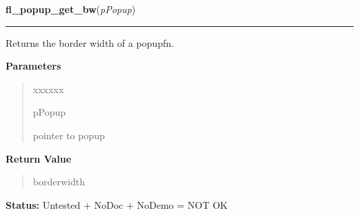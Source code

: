 \hspace{.8\funcindent}\begin{boxedminipage}{\funcwidth}

    \raggedright \textbf{fl\_popup\_get\_bw}(\textit{pPopup})

    \vspace{-1.5ex}

    \rule{\textwidth}{0.5\fboxrule}
\setlength{\parskip}{2ex}
    Returns the border width of a popupfn.

\setlength{\parskip}{1ex}
      \textbf{Parameters}
      \vspace{-1ex}

      \begin{quote}
        \begin{Ventry}{xxxxxx}

          \item[pPopup]

          pointer to popup

        \end{Ventry}

      \end{quote}

      \textbf{Return Value}
    \vspace{-1ex}

      \begin{quote}
      borderwidth

      \end{quote}

\textbf{Status:} Untested + NoDoc + NoDemo = NOT OK



    \end{boxedminipage}

    \label{xformslib:flpopup:fl_popup_set_bw}

    \vspace{0.5ex}

